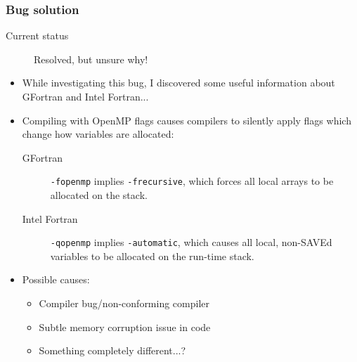 \documentclass{beamer}
\begin{document}
\begin{frame}
  \frametitle{Bug solution}
  \begin{description}
    \item[Current status] Resolved, but unsure why!
  \end{description}
  {\footnotesize
  \begin{itemize}
    \item While investigating this bug, I discovered some useful information about GFortran and Intel Fortran...
    \item Compiling with OpenMP flags causes compilers to silently apply flags which change how variables are allocated:
    \begin{description}
      \item[GFortran] \texttt{-fopenmp} implies \texttt{-frecursive}, which forces all local arrays to be allocated on the stack.
      \item[Intel Fortran] \texttt{-qopenmp} implies \texttt{-automatic}, which causes all local, non-SAVEd variables to be allocated on the run-time stack.
    \end{description}
    \item Possible causes:
    \begin{itemize} 
      \item Compiler bug/non-conforming compiler
      \item Subtle memory corruption issue in code
      \item Something completely different...?
    \end{itemize}
  \end{itemize}
  }

\end{frame}
\end{document}
